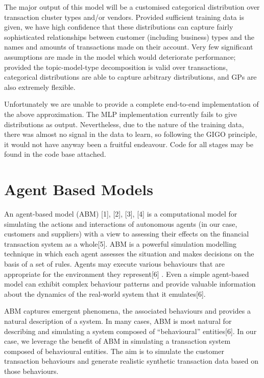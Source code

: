 \documentclass[]{article}
\begin{document}
The major output of this model will be a customised categorical
distribution over transaction cluster types and/or vendors. Provided
sufficient training data is given, we have high confidence that these
distributions can capture fairly sophisticated relationships between
customer (including business) types and the names and amounts of
transactions made on their account. Very few significant assumptions are
made in the model which would deteriorate performance; provided the
topic-model-type decomposition is valid over transactions, categorical
distributions are able to capture arbitrary distributions, and GPs are
also extremely flexible.

Unfortunately we are unable to provide a complete end-to-end
implementation of the above approximation. The MLP implementation
currently fails to give distributions as output. Nevertheless, due to
the nature of the training data, there was almost no signal in the data
to learn, so following the GIGO principle, it would not have anyway been
a fruitful endeavour. Code for all stages may be found in the code base
attached.

\section{Agent Based Models}\label{agent-based-models}

An agent-based model (ABM) {[}1{]}, {[}2{]}, {[}3{]}, {[}4{]} is a
computational model for simulating the actions and interactions of
autonomous agents (in our case, customers and suppliers) with a view to
assessing their effects on the financial transaction system as a
whole{[}5{]}. ABM is a powerful simulation modelling technique in which
each agent assesses the situation and makes decisions on the basis of a
set of rules. Agents may execute various behaviours that are appropriate
for the environment they represent{[}6{]} . Even a simple agent-based
model can exhibit complex behaviour patterns and provide valuable
information about the dynamics of the real-world system that it
emulates{[}6{]}.

ABM captures emergent phenomena, the associated behaviours and provides
a natural description of a system. In many cases, ABM is most natural
for describing and simulating a system composed of ``behavioural''
entities{[}6{]}. In our case, we leverage the benefit of ABM in
simulating a transaction system composed of behavioural entities. The
aim is to simulate the customer transaction behaviours and generate
realistic synthetic transaction data based on those behaviours.
\end{document}
